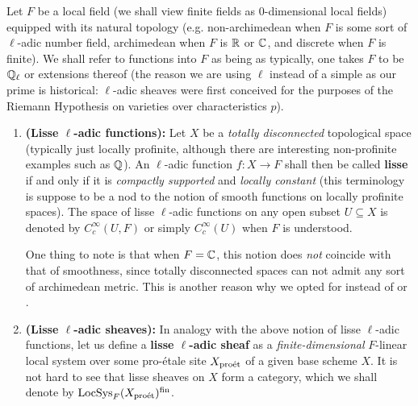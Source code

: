                 \begin{definition} \label{def: lisse_sheaves}
                    Let $F$ be a local field (we shall view finite fields as $0$-dimensional local fields) equipped with its natural topology (e.g. non-archimedean when $F$ is some sort of $\ell$-adic number field, archimedean when $F$ is $\mathbb{R}$ or $\mathbb{C}$, and discrete when $F$ is finite). We shall refer to functions into $F$ as being  as typically, one takes $F$ to be $\mathbb{Q}_{\ell}$ or extensions thereof (the reason we are using $\ell$ instead of a simple  as our prime is historical: $\ell$-adic sheaves were first conceived for the purposes of the Riemann Hypothesis on varieties over characteristics $p$).
                    \begin{enumerate}
                        \item \textbf{(Lisse $\ell$-adic functions):} Let $X$ be a \textit{totally disconnected} topological space (typically just locally profinite, although there are interesting non-profinite examples such as $\mathbb{Q}$). An $\ell$-adic function $f: X \to F$ shall then be called \textbf{lisse} if and only if it is \textit{compactly supported} and \textit{locally constant} (this terminology is suppose to be a nod to the notion of smooth functions on locally profinite spaces). The space of lisse $\ell$-adic functions on any open subset $U \subseteq X$ is denoted by $C^{\infty}_c(U, F)$ or simply $C^{\infty}_c(U)$ when $F$ is understood.
                        
                        One thing to note is that when $F = \mathbb{C}$, this notion does \textit{not} coincide with that of smoothness, since totally disconnected spaces can not admit any sort of archimedean metric. This is another reason why we opted for  instead of  or .
                        \item \textbf{(Lisse $\ell$-adic sheaves):} In analogy with the above notion of lisse $\ell$-adic functions, let us define a \textbf{lisse $\ell$-adic sheaf} as a \textit{finite-dimensional} $F$-linear local system over some pro-\'etale site $X_{\mathrm{pro\acute{e}t}}$ of a given base scheme $X$. It is not hard to see that lisse sheaves on $X$ form a category, which we shall denote by $\mathrm{LocSys}_F(X_{\mathrm{pro\acute{e}t}})^{\mathrm{fin}}$.
                    \end{enumerate}
                \end{definition}
            
